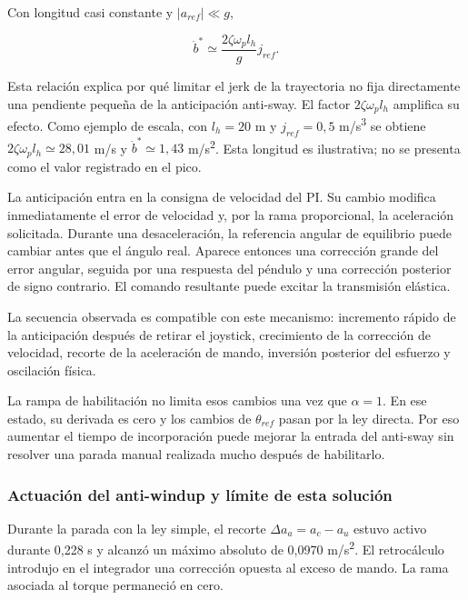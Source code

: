 \documentclass[a4paper,10pt,onecolumn,journal]{ieeeconf}
\numberwithin{equation}{section}
\begin{document}
Con longitud casi constante y $|a_{ref}|\ll g$,

\begin{equation}
\dot b^*\simeq\frac{2\zeta\omega_p l_h}{g}j_{ref}.
\end{equation}

Esta relación explica por qué limitar el jerk de la trayectoria no fija directamente una pendiente pequeña de la anticipación anti-sway. El factor $2\zeta\omega_p l_h$ amplifica su efecto. Como ejemplo de escala, con $l_h=20$ m y $j_{ref}=0,5$ m/s\textsuperscript{3} se obtiene $2\zeta\omega_p l_h\simeq28,01$ m/s y $\dot b^*\simeq1,43$ m/s\textsuperscript{2}. Esta longitud es ilustrativa; no se presenta como el valor registrado en el pico.

La anticipación entra en la consigna de velocidad del PI. Su cambio modifica inmediatamente el error de velocidad y, por la rama proporcional, la aceleración solicitada. Durante una desaceleración, la referencia angular de equilibrio puede cambiar antes que el ángulo real. Aparece entonces una corrección grande del error angular, seguida por una respuesta del péndulo y una corrección posterior de signo contrario. El comando resultante puede excitar la transmisión elástica.

La secuencia observada es compatible con este mecanismo: incremento rápido de la anticipación después de retirar el joystick, crecimiento de la corrección de velocidad, recorte de la aceleración de mando, inversión posterior del esfuerzo y oscilación física.

La rampa de habilitación no limita esos cambios una vez que $\alpha=1$. En ese estado, su derivada es cero y los cambios de $\theta_{ref}$ pasan por la ley directa. Por eso aumentar el tiempo de incorporación puede mejorar la entrada del anti-sway sin resolver una parada manual realizada mucho después de habilitarlo.


\subsubsection{Actuación del anti-windup y límite de esta solución}

Durante la parada con la ley simple, el recorte $\Delta a_a=a_c-a_u$ estuvo activo durante 0,228 s y alcanzó un máximo absoluto de 0,0970 m/s\textsuperscript{2}. El retrocálculo introdujo en el integrador una corrección opuesta al exceso de mando. La rama asociada al torque permaneció en cero.
\end{document}
